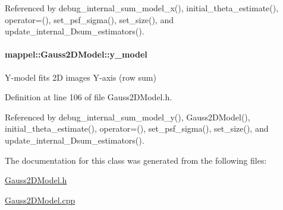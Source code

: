 Referenced by debug\+\_\+internal\+\_\+sum\+\_\+model\+\_\+x(), initial\+\_\+theta\+\_\+estimate(), operator=(), set\+\_\+psf\+\_\+sigma(), set\+\_\+size(), and update\+\_\+internal\+\_\+Dsum\+\_\+estimators().

\paragraph[{\texorpdfstring{y\+\_\+model}{y_model}}]{ mappel\+::\+Gauss2\+D\+Model\+::y\+\_\+model\hspace{0.3cm}{\ttfamily [protected]}}\hypertarget{classmappel_1_1Gauss2DModel_ae6b9107d70f810534ad2c65213aae340}{}\label{classmappel_1_1Gauss2DModel_ae6b9107d70f810534ad2c65213aae340}
Y-\/model fits 2D images Y-\/axis (row sum) 

Definition at line 106 of file Gauss2\+D\+Model.\+h.



Referenced by debug\+\_\+internal\+\_\+sum\+\_\+model\+\_\+y(), Gauss2\+D\+Model(), initial\+\_\+theta\+\_\+estimate(), operator=(), set\+\_\+psf\+\_\+sigma(), set\+\_\+size(), and update\+\_\+internal\+\_\+Dsum\+\_\+estimators().



The documentation for this class was generated from the following files\+:\begin{DoxyCompactItemize}
\item 
\hyperlink{Gauss2DModel_8h}{Gauss2\+D\+Model.\+h}\item 
\hyperlink{Gauss2DModel_8cpp}{Gauss2\+D\+Model.\+cpp}\end{DoxyCompactItemize}

